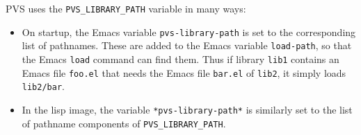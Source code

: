PVS uses the \texttt{PVS\_LIBRARY\_PATH} variable in many ways:
\begin{itemize}
\item On startup, the Emacs variable
\texttt{pvs-library-path}
is set to the corresponding list of pathnames.  These are added to the
Emacs variable \texttt{load-path}, so
that the Emacs \texttt{load} command can find them.  Thus if library
\texttt{lib1} contains an Emacs file \texttt{foo.el} that needs the Emacs
file \texttt{bar.el} of \texttt{lib2}, it simply loads \texttt{lib2/bar}.

\item In the lisp image, the variable \texttt{*pvs-library-path*} is
similarly set to the list of pathname components of
\texttt{PVS\_LIBRARY\_PATH}.  

\end{itemize}


